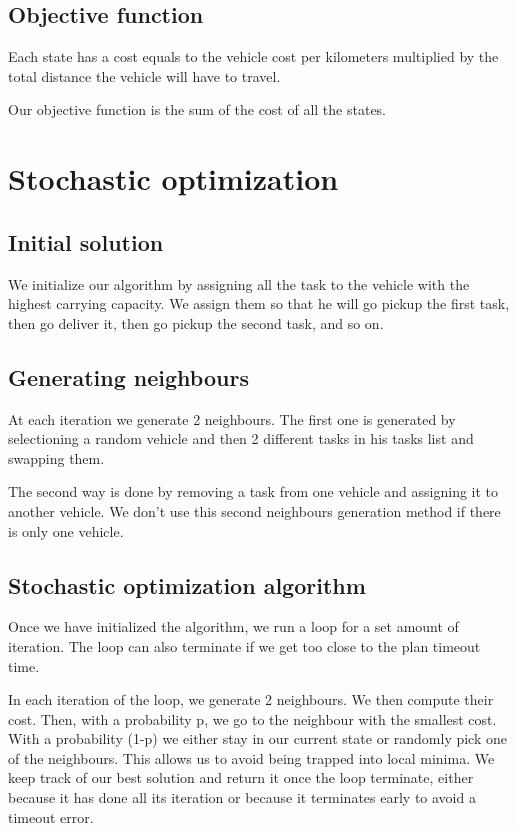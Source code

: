 \documentclass[11pt]{article}
\begin{document}
\subsection{Objective function}
Each state has a cost equals to the vehicle cost per kilometers multiplied by the total distance the vehicle will have to travel.

Our objective function is the sum of the cost of all the states.


\section{Stochastic optimization}

\subsection{Initial solution}
We initialize our algorithm by assigning all the task to the vehicle with the highest carrying capacity. We assign them so that he will go pickup the first task, then go deliver it, then go pickup the second task, and so on.

\subsection{Generating neighbours}
At each iteration we generate 2 neighbours. The first one is generated by selectioning a random vehicle and then 2 different tasks in his tasks list and swapping them. 

The second way is done by removing a task from one vehicle and assigning it to another vehicle. We don't use this second neighbours generation method if there is only one vehicle.

\subsection{Stochastic optimization algorithm}
Once we have initialized the algorithm, we run a loop for a set amount of iteration. The loop can also terminate if we get too close to the plan timeout time.

In each iteration of the loop, we generate 2 neighbours. We then compute their cost. Then, with a probability p, we go to the neighbour with the smallest cost. With a probability (1-p) we either stay in our current state or randomly pick one of the neighbours. This allows us to avoid being trapped into local minima. We keep track of our best solution and return it once the loop terminate, either because it has done all its iteration or because it terminates early to avoid a timeout error.
\end{document}
